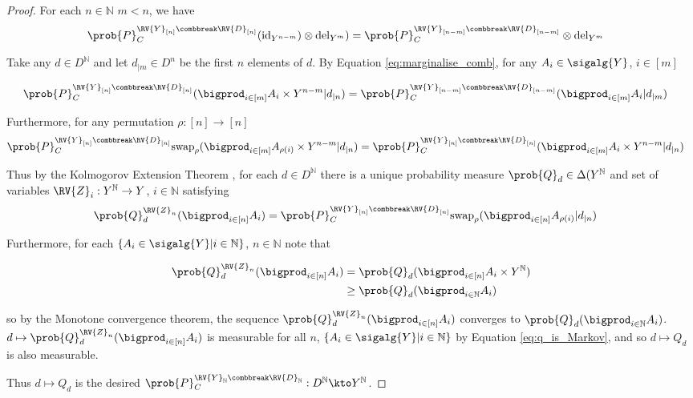 \begin{proof}
For each $n\in \mathbb{N}$ $m<n$, we have
\begin{align}
    \prob{P}_C^{\RV{Y}_{[n]}\combbreak \RV{D}_{[n]}}(\mathrm{id}_{Y^{n-m}})\otimes \mathrm{del}_{Y^m}) &= \prob{P}_C^{\RV{Y}_{[n-m]}\combbreak \RV{D}_{[n-m]}}\otimes \mathrm{del}_{Y^m}\label{eq:marginalise_comb}
\end{align}

Take any $d\in D^{\mathbb{N}}$ and let $d_{|m}\in D^n$ be the first $n$ elements of $d$. By Equation \ref{eq:marginalise_comb}, for any $A_i\in \sigalg{Y}$, $i\in [m]$

\begin{align}
    \prob{P}_C^{\RV{Y}_{[n]}\combbreak \RV{D}_{[n]}}(\bigprod_{i\in [m]}A_i\times Y^{n-m}|d_{|n}) &= \prob{P}_C^{\RV{Y}_{[n-m]}\combbreak \RV{D}_{[n-m]}}(\bigprod_{i\in [m]}A_i|d_{|m})
\end{align}

Furthermore, for any permutation $\rho:[n]\to[n]$
\begin{align}
    \prob{P}_C^{\RV{Y}_{[n]}\combbreak \RV{D}_{[n]}}\mathrm{swap}_{\rho}(\bigprod_{i\in [m]}A_{\rho(i)}\times Y^{n-m}|d_{|n}) &= \prob{P}_C^{\RV{Y}_{[n]}\combbreak \RV{D}_{[n]}}(\bigprod_{i\in [m]}A_{i}\times Y^{n-m}|d_{|n})
\end{align}

Thus by the Kolmogorov Extension Theorem \citep{cinlar_probability_2011}, for each $d\in D^{\mathbb{N}}$ there is a unique probability measure $\prob{Q}_d\in \Delta(Y^{\mathbb{N}}$ and set of variables $\RV{Z}_i:Y^{\mathbb{N}}\to Y$, $i\in \mathbb{N}$ satisfying
\begin{align}
    \prob{Q}_d^{\RV{Z}_{n}}(\bigprod_{i\in [n]}A_i) &= \prob{P}_C^{\RV{Y}_{[n]}\combbreak \RV{D}_{[n]}}\mathrm{swap}_{\rho}(\bigprod_{i\in [n]}A_{\rho(i)}|d_{|n})\label{eq:q_is_Markov}
\end{align}

Furthermore, for each $\{A_i\in\sigalg{Y}|i\in \mathbb{N}\}$, $n\in \mathbb{N}$ note that

\begin{align}
    \prob{Q}_d^{\RV{Z}_n}(\bigprod_{i\in[n]} A_i) &= \prob{Q}_d(\bigprod_{i\in[n]} A_i \times Y^{\mathbb{N}})\\
    &\geq \prob{Q}_d(\bigprod_{i\in\mathbb{N}} A_i)
\end{align}

so by the Monotone convergence theorem, the sequence $\prob{Q}_d^{\RV{Z}_n}(\bigprod_{i\in[n]} A_i)$ converges to $\prob{Q}_d(\bigprod_{i\in\mathbb{N}} A_i)$. $d\mapsto \prob{Q}_d^{\RV{Z}_n}(\bigprod_{i\in[n]} A_i)$ is measurable for all $n$, $\{A_i\in\sigalg{Y}|i\in \mathbb{N}\}$ by Equation \ref{eq:q_is_Markov}, and so $d\mapsto Q_d$ is also measurable.

Thus $d\mapsto Q_d$ is the desired $\prob{P}_C^{\RV{Y}_{\mathbb{N}}\combbreak \RV{D}_{\mathbb{N}}}:D^\mathbb{N}\kto Y^\mathbb{N}$.
\end{proof}

